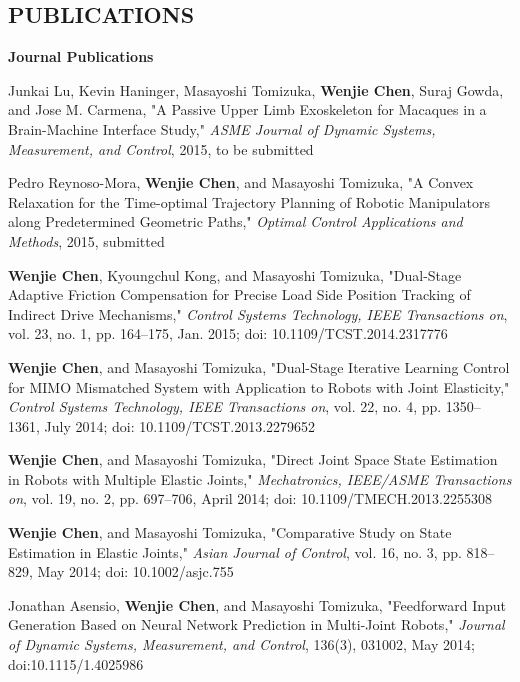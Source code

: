 \documentclass{res}
\begin{document}
\begin{resume}
\section{PUBLICATIONS}
\vspace{0.1in}
    \textbf{Journal Publications} %
    \begin{etaremune}[start=7]
    \item Junkai Lu, Kevin Haninger, Masayoshi Tomizuka, \textbf{Wenjie Chen}, Suraj Gowda, and Jose M. Carmena, "A Passive Upper Limb Exoskeleton for Macaques in a Brain-Machine Interface Study," \emph{ASME Journal of Dynamic Systems, Measurement, and Control}, 2015, to be submitted
    \item Pedro Reynoso-Mora, \textbf{Wenjie Chen}, and Masayoshi Tomizuka, "A Convex Relaxation for the Time-optimal Trajectory Planning of Robotic Manipulators along Predetermined Geometric Paths," \emph{Optimal Control Applications and Methods}, 2015, submitted
    \item \textbf{Wenjie Chen}, Kyoungchul Kong, and Masayoshi Tomizuka, "Dual-Stage Adaptive Friction Compensation for Precise Load Side Position Tracking of Indirect Drive Mechanisms," \emph{Control Systems Technology, IEEE Transactions on}, vol. 23, no. 1, pp. 164--175, Jan. 2015;  doi: 10.1109/TCST.2014.2317776
    \item \textbf{Wenjie Chen}, and Masayoshi Tomizuka, "Dual-Stage Iterative Learning Control for MIMO Mismatched System with Application to Robots with Joint Elasticity," \emph{Control Systems Technology, IEEE Transactions on}, vol. 22, no. 4, pp. 1350--1361, July 2014; doi: 10.1109/TCST.2013.2279652
    \item \textbf{Wenjie Chen}, and Masayoshi Tomizuka, "Direct Joint Space State Estimation in Robots with Multiple Elastic Joints," \emph{Mechatronics, IEEE/ASME Transactions on}, vol. 19, no. 2, pp. 697--706, April 2014; doi: 10.1109/TMECH.2013.2255308
    \item \textbf{Wenjie Chen}, and Masayoshi Tomizuka, "Comparative Study on State Estimation in Elastic Joints," \emph{Asian Journal of Control}, vol. 16, no. 3, pp. 818--829, May 2014; doi: 10.1002/asjc.755%
    \item Jonathan Asensio, \textbf{Wenjie Chen}, and Masayoshi Tomizuka, "Feedforward Input Generation Based on Neural Network Prediction in Multi-Joint Robots," \emph{Journal of Dynamic Systems, Measurement, and Control}, 136(3), 031002, May 2014;   doi:10.1115/1.4025986
    \end{etaremune}


\end{resume}
\end{document}
